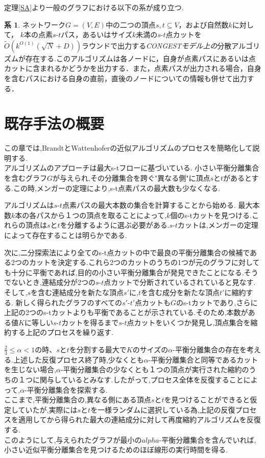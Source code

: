 \documentclass{thesis}
\theoremstyle{definition}
\newtheorem{corollary}{系}
\begin{document}
定理\ref{SA}より一般のグラフにおける以下の系が成り立つ.

\begin{corollary}
    ネットワーク$G=(V,E)$中の二つの頂点$s,t\subseteq V$，および自然数$k$に対して，
    $k$本の点素$s$-$t$パス，あるいはサイズ$k$未満の$s$-$t$点カットを
    $\tilde{O}(k^{O(1)}(\sqrt{N} + D))$ラウンドで出力する\textit{CONGESTモデル上の}分散アルゴリズムが存在する.このアルゴリズムは各ノードに，自身が点素パスにあるいは点カットに含まれるかどうかを出力する．また，点素パスが出力される場合，自身を含むパスにおける自身の直前，直後のノードについての情報も併せて出力する．
    \end{corollary}

\chapter{既存手法の概要}

この章では,BrandtとWattenhoferの近似アルゴリズム\cite{brandt2017approximating}のプロセスを簡略化して説明する.\\

アルゴリズムのアプローチは最大s-tフローに基づいている.
小さい平衡分離集合を含むグラフ$G$が与えられ,その分離集合を跨ぐ"異なる側"に頂点$s$と$t$があるとする.この時,メンガーの定理により,s-t点素パスの最大数も少なくなる.\par
アルゴリズムは$s$-$t$点素パスの最大本数の集合を計算することから始める.
最大本数$k$本の各パスから１つの頂点を取ることによって,$k$個のs-tカットを見つける.これらの頂点は$s$と$t$を分離するように選ぶ必要がある.$s$-$t$カットは,メンガーの定理によって存在することは明らかである.\par

次に,二分探索法により全てのs-t点カットの中で最良の平衡分離集合の候補である2つのカットを決定する.これら2つのカットのうちの1つが元のグラフに対しても十分に平衡であれば,目的の小さい平衡分離集合が発見できたことになる.そうでないとき,連結成分が2つの$s$-$t$点カットで分断されているされていると見なす.そして,$s$を含む連結成分を新たな頂点$s'$に,$t$を含む成分を新たな頂点$t'$に縮約する.
新しく得られたグラフのすべての$s'$-$t'$点カットも$G$のs-tカットであり,さらに上記の2つのs-tカットよりも平衡であることが示されている.そのため,本数がある値$K$に等しい$s$-$t$カットを得るまで$s$-$t$点カットをいくつか発見し,頂点集合を縮約する上記のプロセスを繰り返す.\par

$\frac{2}{3} \leq \alpha < 1$の時、$s$と$t$を分割する最大で$K$のサイズの$\alpha$-平衡分離集合の存在を考える.上述した反復プロセス終了時,少なくとも$\alpha$-平衡分離集合と同等であるカットを生じない場合,$\alpha$-平衡分離集合の少なくとも１つの頂点が実行された縮約のうちの１つに関与しているとみなす.したがって,プロセス全体を反復することによって,$\alpha$-平衡分離集合を探索する.\\
ここまで,平衡分離集合の,異なる側にある頂点$s$と$t$を見つけることができると仮定していたが,実際には$s$と$t$を一様ランダムに選択している為,上記の反復プロセスを適用してから得られた最大の連結成分に対して再度縮約アルゴリズムを反復する.\\
このようにして,与えられたグラフが最小の$alpha$-平衡分離集合を含んでいれば,小さい近似平衡分離集合を見つけるためのほぼ線形の実行時間を得る.\par
\end{document}
